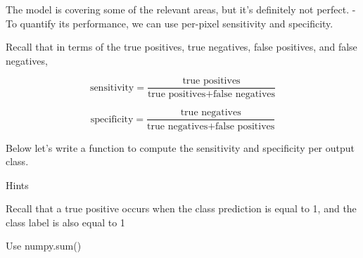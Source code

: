 \documentclass[11pt]{article}
\begin{document}
The model is covering some of the relevant areas, but it's definitely
not perfect. - To quantify its performance, we can use per-pixel
sensitivity and specificity.

Recall that in terms of the true positives, true negatives, false
positives, and false negatives,

\[\text{sensitivity} = \frac{\text{true positives}}{\text{true positives} + \text{false negatives}}\]

\[\text{specificity} = \frac{\text{true negatives}}{\text{true negatives} + \text{false positives}}\]

Below let's write a function to compute the sensitivity and specificity
per output class.

     Hints

Recall that a true positive occurs when the class prediction is equal to
1, and the class label is also equal to 1

Use numpy.sum() 
\end{document}
